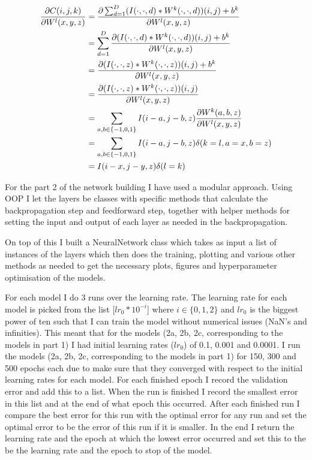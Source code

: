 \documentclass{article}
\begin{document}
\begin{enumerate}[label=(\roman*)]
\begin{enumerate}
    \begin{align*}
      \pdv{C(i, j, k)}{W^l(x, y, z)} & = \pdv{\sum_{d = 1}^D (I(\cdot, \cdot, d) * W^{k}(\cdot, \cdot, d))(i, j) + b^{k}}{W^l(x, y, z)} \\
                                     & = \sum_{d = 1}^D \pdv{(I(\cdot, \cdot, d) * W^{k}(\cdot, \cdot, d))(i, j) + b^{k}}{W^l(x, y, z)} \\
                                     & = \pdv{(I(\cdot, \cdot, z) * W^{k}(\cdot, \cdot, z))(i, j) + b^{k}}{W^l(x, y, z)} \\
                                     & = \pdv{(I(\cdot, \cdot, z) * W^{k}(\cdot, \cdot, z))(i, j)}{W^l(x, y, z)} \\
                                     & = \sum_{a, b \in \{-1, 0, 1\}} I(i - a, j - b, z)\pdv{W^k(a, b, z)}{W^l(x, y, z)} \\
                                     & = \sum_{a, b \in \{-1, 0, 1\}} I(i - a, j - b, z)\delta(k = l, a = x, b = z) \\
                                     & = I(i - x, j - y, z)\delta(l = k)
    \end{align*}
        
  \end{enumerate}
  
\end{enumerate}

For the part 2 of the network building I have used a modular approach. Using OOP
I let the layers be classes with specific methods that calculate the
backpropagation step and feedforward step, together with helper methods for
setting the input and output of each layer as needed in the backpropagation.

On top of this I built a NeuralNetwork class which takes as input a list of
instances of the layers which then does the training, plotting and various other
methods as needed to get the necessary plots, figures and hyperparameter
optimisation of the models.

For each model I do 3 runs over the learning rate. The learning rate for each
model is picked from the list [$lr_0*10^{-i}$] where $i \in \{0, 1, 2\}$ and
$lr_0$ is the biggest power of ten such that I can train the model without
numerical issues (NaN's and infinities). This meant that for the models (2a, 2b, 2c,
corresponding to the models in part 1) I had initial learning rates ($lr_0$) of
0.1, 0.001 and 0.0001. I run the models (2a, 2b, 2c,
corresponding to the models in part 1) for 150, 300 and 500 epochs each due to
make sure that they converged with respect to the initial learning rates for
each model.
For each finished epoch I record the validation error and add this to a list.
When the run is finished I record the smallest error in this list and at the end
of what epoch this occurred. After each finished run I compare the best error
for this run with the optimal error for any run and set the optimal error to be
the error of this run if it is smaller. In the end I return the learning rate
and the epoch at which the lowest error occurred and set this to the be the
learning rate and the epoch to stop of the model.
\end{document}
